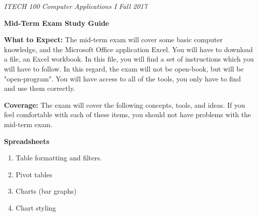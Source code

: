 \documentclass[a4paper, 11pt]{article}
\begin{document}
\noindent
\textit{ITECH 100} \hfill \textit{Computer Applications I} \hfill \textit{Fall 2017}
\begin{center}
\large\textbf{Mid-Term Exam Study Guide}
\end{center}

\large\textbf{What to Expect:}
The mid-term exam will cover some basic computer knowledge, and the Microsoft Office application Excel. You will have to download a file, an Excel workbook. In this file, you will find a set of instructions which you will have to follow. In this regard, the exam will not be open-book, but will be "open-program". You will have access to all of the tools, you only have to find and use them correctly.

\large\textbf{Coverage:}
The exam will cover the following concepts, tools, and ideas. If you feel comfortable with each of these items, you should not have problems with the mid-term exam.

\large\textbf{Spreadsheets}
\begin{enumerate}[noitemsep]
    \item Table formatting and filters.
    \item Pivot tables
    \item Charts (bar graphs)
    \item Chart styling
\end{enumerate}
\end{document}
